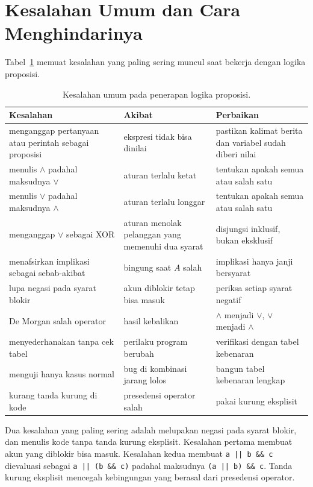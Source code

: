 \documentclass[11pt,a4paper]{article}
\begin{document}
\section{Kesalahan Umum dan Cara Menghindarinya}

Tabel~\ref{tab:kesalahan} memuat kesalahan yang paling sering muncul saat bekerja dengan logika proposisi.

\begin{table}[H]
	\centering
	\caption{Kesalahan umum pada penerapan logika proposisi.}
	\label{tab:kesalahan}
	\footnotesize
	\begin{tabularx}{\textwidth}{l X X}
		\toprule
		Kesalahan & Akibat & Perbaikan \\
		\midrule
		menganggap pertanyaan atau perintah sebagai proposisi & ekspresi tidak bisa dinilai & pastikan kalimat berita dan variabel sudah diberi nilai \\
		menulis $\wedge$ padahal maksudnya $\vee$ & aturan terlalu ketat & tentukan apakah semua atau salah satu \\
		menulis $\vee$ padahal maksudnya $\wedge$ & aturan terlalu longgar & tentukan apakah semua atau salah satu \\
		menganggap $\vee$ sebagai XOR & aturan menolak pelanggan yang memenuhi dua syarat & disjungsi inklusif, bukan eksklusif \\
		menafsirkan implikasi sebagai sebab-akibat & bingung saat $A$ salah & implikasi hanya janji bersyarat \\
		lupa negasi pada syarat blokir & akun diblokir tetap bisa masuk & periksa setiap syarat negatif \\
		De Morgan salah operator & hasil kebalikan & $\wedge$ menjadi $\vee$, $\vee$ menjadi $\wedge$ \\
		menyederhanakan tanpa cek tabel & perilaku program berubah & verifikasi dengan tabel kebenaran \\
		menguji hanya kasus normal & bug di kombinasi jarang lolos & bangun tabel kebenaran lengkap \\
		kurang tanda kurung di kode & presedensi operator salah & pakai kurung eksplisit \\
		\bottomrule
	\end{tabularx}
\end{table}

Dua kesalahan yang paling sering adalah melupakan negasi pada syarat blokir, dan menulis kode tanpa tanda kurung eksplisit. Kesalahan pertama membuat akun yang diblokir bisa masuk. Kesalahan kedua membuat \texttt{a || b \&\& c} dievaluasi sebagai \texttt{a || (b \&\& c)} padahal maksudnya \texttt{(a || b) \&\& c}. Tanda kurung eksplisit mencegah kebingungan yang berasal dari presedensi operator.
\end{document}
